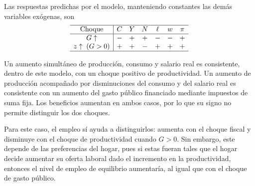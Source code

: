 \documentclass[11pt]{article}
\begin{document}
Las respuestas predichas por el modelo, manteniendo constantes las demás variables exógenas, son
\[
\begin{array}{c|cccccc}
  \hline
  \text{Choque} & C & Y & N & \ell & w & \pi \\
  \hline
  G\uparrow & - & + & + & - & - & + \\
  z\uparrow\;(G>0) & + & + & - & + & + & + \\
  \hline
\end{array}
\]

Un aumento simultáneo de producción, consumo y salario real es consistente, dentro de este modelo, con un choque positivo de productividad. Un aumento de producción acompañado por disminuciones del consumo y del salario real es consistente con un aumento del gasto público financiado mediante impuestos de suma fija. Los beneficios aumentan en ambos casos, por lo que su signo no permite distinguir los dos choques. 

Para este caso, el empleo sí ayuda a distinguirlos: aumenta con el choque fiscal y disminuye con el choque de productividad cuando $G>0$. Sin embargo, este depende de las preferencias del hogar, pues si estas fueran tales que el hogar decide aumentar su oferta laboral dado el incremento en la productividad, entonces el nivel de empleo de equilibrio aumentaría, al igual que con el choque de gasto público.
\end{document}
